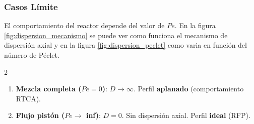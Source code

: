 \subsubsection*{Casos Límite}

\noindent El comportamiento del reactor depende del valor de $Pe$. En la figura \ref{fig:dispersion_mecanismo} se puede ver como funciona el mecanismo de dispersión axial y en la figura \ref{fig:dispersion_peclet} como varia en función del número de Péclet.

\begin{multicols}{2}
    \begin{enumerate}
        \item \textbf{Mezcla completa ($Pe=0$)}: $D \to \infty$. Perfil \textbf{aplanado} (comportamiento RTCA).
        \item \textbf{Flujo pistón ($Pe \to$ inf)}: $D=0$. Sin dispersión axial. Perfil \textbf{ideal} (RFP).
    \end{enumerate}
\end{multicols}

